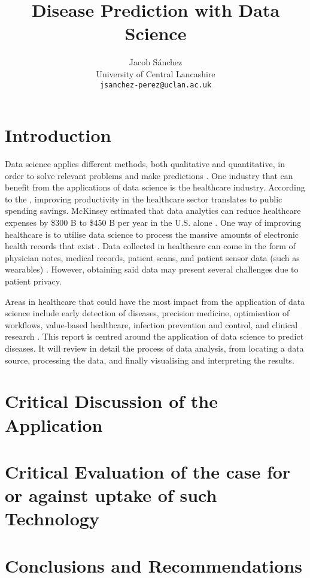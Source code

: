 \documentclass[a4paper,12pt]{article}
\title{Disease Prediction with Data Science}
\author{Jacob Sánchez\\ University of Central Lancashire\\\texttt{jsanchez-perez@uclan.ac.uk}}
\date{}
\begin{document}
\maketitle


\section{Introduction}


Data science applies different methods, both qualitative and quantitative, in order to solve relevant problems and make predictions \parencite[78]{Waller2013}.
One industry that can benefit from the applications of data science is the healthcare industry.
According to the \textcite{oecd2010health}, improving productivity in the healthcare sector translates to public spending savings.
McKinsey estimated that data analytics can reduce healthcare expenses by \$300 B to \$450 B per year in the U.S. alone \parencite{Groves2013}.
One way of improving healthcare is to utilise data science to process the massive amounts of electronic health records that exist \parencite{Dalianis2015}.
Data collected in healthcare can come in the form of physician notes, medical records, patient scans, and patient sensor data (such as wearables) \parencite{Adam2017}.
However, obtaining said data may present several challenges due to patient privacy. 

Areas in healthcare that could have the most impact from the application of data science include early detection of diseases, precision medicine, optimisation of workflows, value-based healthcare, infection prevention and control, and clinical research \parencite[9]{Consoli2019}.
This report is centred around the application of data science to predict diseases.
It will review in detail the process of data analysis, from locating a data source, processing the data, and finally visualising and interpreting the results.

\section{Critical Discussion of the Application}



\section{Critical Evaluation of the case for or against uptake of such Technology}
\section{Conclusions and Recommendations}

\printbibliography
\end{document}
